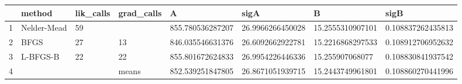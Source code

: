 \begin{table}[ht]
\begin{center}
\begin{tabular}{rlllllll}
  \hline
 & method & lik\_calls & grad\_calls & A & sigA & B & sigB \\ 
  \hline
1 & Nelder-Mead & 59 &  & 855.780536287207 & 26.9966266450028 & 15.2555310907101 & 0.108837262435813 \\ 
  2 & BFGS & 27 & 13 & 846.035546631376 & 26.6092662922781 & 15.2216868297533 & 0.108912706952632 \\ 
  3 & L-BFGS-B & 22 & 22 & 855.801672624833 & 26.9954226446336 & 15.255907068077 & 0.108830841937542 \\ 
  4 &  &  & means & 852.539251847805 & 26.8671051939715 & 15.2443749961801 & 0.108860270441996 \\ 
   \hline
\end{tabular}
\end{center}
\end{table}
